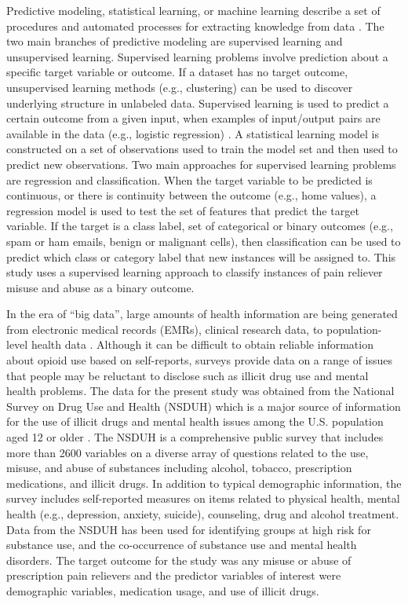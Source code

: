 \documentclass[sigconf]{acmart}
\begin{document}
Predictive modeling, statistical learning, or machine learning describe a 
set of procedures and automated processes for extracting knowledge from data 
\cite{james13, kuhn13, muller17, raschka17}. The two main branches of 
predictive modeling are supervised learning and unsupervised learning. 
Supervised learning problems involve prediction about a specific target 
variable or outcome. If a dataset has no target outcome, unsupervised learning 
methods (e.g., clustering) can be used to discover underlying structure 
in unlabeled data. Supervised learning is used to predict a certain outcome 
from a given input, when examples of input/output pairs are available in the 
data (e.g., logistic regression) \cite{muller17}. A statistical learning model 
is constructed on a set of observations used to train the model set and then 
used to predict new observations. Two main approaches for supervised learning 
problems are regression and classification. When the target variable
to be predicted is continuous, or there is continuity between the outcome 
(e.g., home values), a regression model is used to test the set of features 
that predict the target variable. If the target is a class label, set of 
categorical or binary outcomes (e.g., spam or ham emails, benign or malignant 
cells), then classification can be used to predict which class or category 
label that new instances will be assigned to. This study uses a supervised 
learning approach to classify instances of pain reliever misuse and abuse
as a binary outcome. 


In the era of ``big data'', large amounts of health information are being 
generated from electronic medical records (EMRs), clinical research data, to 
population-level health data \cite{herland14}. Although it can be difficult 
to obtain reliable information about opioid use based on self-reports, surveys 
provide data on a range of issues that people may be reluctant to disclose 
such as illicit drug use and mental health problems. The data for the present 
study was obtained from the National Survey on Drug Use and Health (NSDUH) 
which is a major source of information for the use of illicit drugs and mental 
health issues among the U.S. population aged 12 or older \cite{samhsa18}. 
The NSDUH is a comprehensive public survey that includes more than 2600 
variables on a diverse array of questions related to the use, misuse, and 
abuse of substances including alcohol, tobacco, prescription medications, and 
illicit drugs. In addition to typical demographic information, the survey
includes self-reported measures on items related to physical health, mental 
health (e.g., depression, anxiety, suicide), counseling, drug and alcohol 
treatment. Data from the NSDUH has been used for identifying groups at high 
risk for substance use, and the co-occurrence of substance use and mental 
health disorders. The target outcome for the study was any misuse or abuse 
of prescription pain relievers and the predictor variables of interest were 
demographic variables, medication usage, and use of illicit drugs. 
\end{document}
